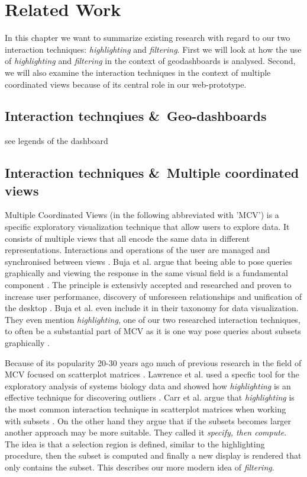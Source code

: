 \chapter{Related Work}
In this chapter we want to summarize existing research with regard to our two interaction techniques:
\textit{highlighting} and \textit{filtering}. First we will look at how the use of \textit{highlighting}
and \textit{filtering} in the context of geodashboards is analysed. Second, we will also examine the
interaction techniques in the context of multiple coordinated views because of its central role in our web-prototype.
\section{Interaction technqiues \&\ Geo-dashboards}

see legends of the dashboard
\section{Interaction techniques \&\ Multiple coordinated views}
Multiple Coordinated Views  (in the following abbreviated with ’MCV’)  is a specific exploratory visualization technique that allow users to explore data.
It consists of multiple views that all encode the same data in different representations. Interactions and
operations of the user are managed and synchronised between views \citep*{Roberts.722007722007}. Buja et al. argue that
beeing able to pose queries graphically and viewing the response in the same visual field is a fundamental component
\citep*{Buja.1996}. The principle is extensivly accepted and researched and proven to increase user performance, discovery
of unforeseen relationships and unification of the desktop \citep*{North.1998}. Buja et al. even include it in their taxonomy
for data visualization. They even mention \textit{highlighting}, one of our two researched interaction techniques,
to often be a substantial part of MCV as it is one way pose queries about subsets graphically \citep*{Buja.1996}.

Because of its popularity 20-30 years ago much of previous research in the field of MCV focused on
scatterplot matrices \citep*{Carr.1987, Becker.1987}. Lawrence et al. used a specfic tool for the exploratory analysis of systems biology data
and showed how \textit{highlighting} is an effective technique for discovering outliers \citep*{Lawrence.2006}.
Carr et al. argue that \textit{highlighting} is the most common interaction technique in scatterplot matrices
when working with subsets \citep*{Carr.1987, Becker.1987}. On the other hand they argue that if the subsets becomes larger
another approach may be more suitable. They called it \textit{specify, then compute}.
The idea is that a selection region is defined, similar to the highlighting procedure, then the subset
is computed and finally a new display is rendered that only contains the subset. This describes our more
modern idea of \textit{filtering}.

